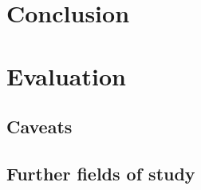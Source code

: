 \section{Conclusion}

\section{Evaluation}
\subsection{Caveats}

\subsection{Further fields of study}
